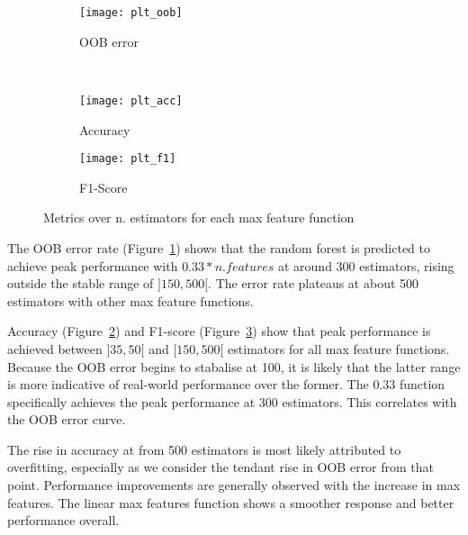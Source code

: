 \begin{figure}[!htb]
  \centering
  \begin{subfigure}[b]{0.70\textwidth}
    \centering
    \texttt{[image: plt\_oob]}
    \caption{OOB error}
    \label{fig:tuning_oob}
  \end{subfigure}\\
  \begin{subfigure}[b]{0.5\textwidth}
    \centering
    \texttt{[image: plt\_acc]}
    \caption{Accuracy}
    \label{fig:tuning_acc}
  \end{subfigure}%
  \begin{subfigure}[b]{0.5\textwidth}
    \centering
    \texttt{[image: plt\_f1]}
    \caption{F1-Score}
    \label{fig:tuning_f1}
  \end{subfigure}
  \caption{Metrics over n. estimators for each max feature function}
  \label{fig:tuning}
\end{figure}

The OOB error rate (Figure~\ref{fig:tuning_oob}) shows that the random forest is
predicted to achieve peak
performance with $0.33 * n. features$ at around 300 estimators, rising outside
the stable range of $]150,500[$.
The error rate plateaus at about 500 estimators with other max feature functions.

Accuracy (Figure~\ref{fig:tuning_acc}) and F1-score (Figure~\ref{fig:tuning_f1})
show that peak performance is achieved between $]35,50[$
and $[150,500[$ estimators for all max feature functions.
Because the OOB error begins to stabalise at 100, it is likely that the latter
range is more indicative of real-world performance over the former.
The $0.33$ function specifically achieves the peak performance at 300 estimators.
This correlates with the OOB error curve.

The rise in accuracy at from 500 estimators is most likely attributed to
overfitting, especially as we consider the tendant rise in OOB error from that
point.
Performance improvements are generally observed with the increase in max features.
The linear max features function shows a smoother response and better
performance overall.\\

